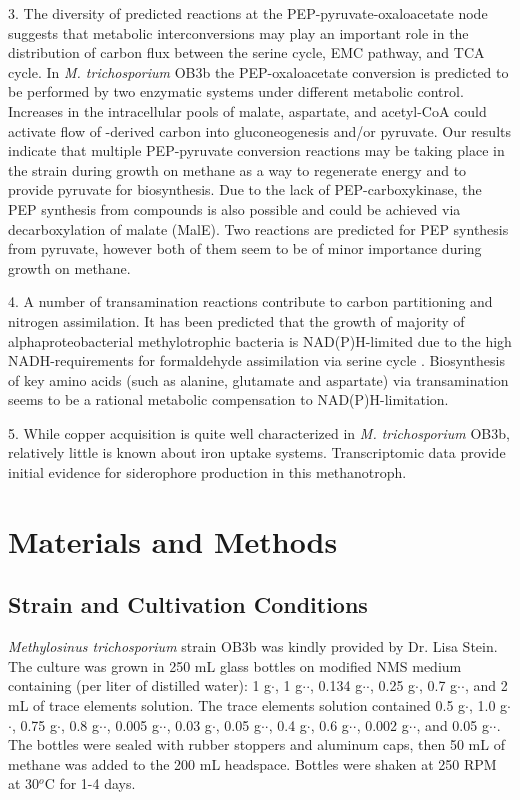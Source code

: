 3. The diversity of predicted reactions at the PEP-pyruvate-oxaloacetate node suggests that metabolic interconversions may play an important role in the distribution of carbon flux between the serine cycle, EMC pathway, and TCA cycle.
In \textit{M. trichosporium} OB3b the PEP-oxaloacetate conversion is predicted to be performed by two enzymatic systems under different metabolic control.
Increases in the intracellular pools of malate, aspartate, and acetyl-CoA could activate flow of -derived carbon into gluconeogenesis and/or pyruvate.
Our results indicate that multiple PEP-pyruvate conversion reactions may be taking place in the strain during growth on methane as a way to regenerate energy and to provide pyruvate for biosynthesis.
Due to the lack of PEP-carboxykinase, the PEP synthesis from  compounds is also possible and could be achieved via decarboxylation of malate (MalE).
Two reactions are predicted for PEP synthesis from pyruvate, however both of them seem to be of minor importance during growth on methane.

4. A number of transamination reactions contribute to carbon partitioning and nitrogen assimilation.
It has been predicted that the growth of majority of alphaproteobacterial methylotrophic bacteria is NAD(P)H-limited due to the high NADH-requirements for formaldehyde assimilation via serine cycle \cite{anthony1978}.
Biosynthesis of key amino acids (such as alanine, glutamate and aspartate) via transamination seems to be a rational metabolic compensation to NAD(P)H-limitation.

5. While copper acquisition is quite well characterized in \textit{M. trichosporium} OB3b, relatively little is known about iron uptake systems.
Transcriptomic data provide initial evidence for siderophore production in this methanotroph.

\section{Materials and Methods}
\subsection{Strain and Cultivation Conditions}
\textit{Methylosinus trichosporium} strain OB3b was kindly provided by Dr. Lisa Stein.
The culture was grown in 250 mL glass bottles on modified NMS medium \cite{whittenbury1970} containing (per liter of distilled water): 1 g$\cdot$, 1 g$\cdot$$\cdot$, 0.134 g$\cdot$$\cdot$, 0.25 g$\cdot$, 0.7 g$\cdot$$\cdot$, and 2 mL of trace elements solution.
The trace elements solution contained 0.5 g$\cdot$, 1.0 g$\cdot$$\cdot$, 0.75 g$\cdot$, 0.8 g$\cdot$$\cdot$, 0.005 g$\cdot$$\cdot$, 0.03 g$\cdot$, 0.05 g$\cdot$$\cdot$, 0.4 g$\cdot$, 0.6 g$\cdot$$\cdot$, 0.002 g$\cdot$$\cdot$, and 0.05 g$\cdot$$\cdot$.
The bottles were sealed with rubber stoppers and aluminum caps, then 50 mL of methane was added to the 200 mL headspace.
Bottles were shaken at 250 RPM at 30$^o$C for 1-4 days.

